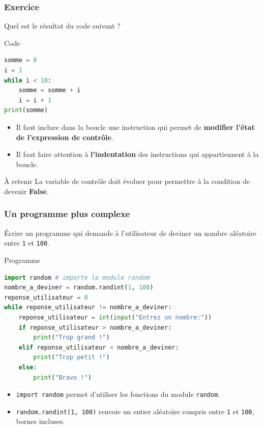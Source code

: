 \documentclass[10pt]{beamer}
\begin{document}
\begin{frame}[containsverbatim]
\frametitle{Exercice}
	
	\begin{alertblock}{}
		Quel est le résultat du code suivant ?
	\end{alertblock}
	
	\vspace{0.15cm}
	
	\begin{exampleblock}{Code}
	\begin{lstlisting}[language=Python]
somme = 0
i = 1
while i < 10:
	somme = somme + i
	i = i + 1
print(somme)
	\end{lstlisting}
	\end{exampleblock}
	\begin{itemize}
		\item Il faut inclure dans la boucle une instruction qui permet
		de \textbf{modifier l'état de l'expression de contrôle}.
		
		\item Il faut faire attention à \textbf{l'indentation} des instructions
		qui appartiennent à la boucle.
	\end{itemize}
	
	\begin{exampleblock}{À retenir}
		\centering
		La variable de contrôle doit évoluer pour permettre
		à la condition de devenir \textbf{False}.
	\end{exampleblock}
\end{frame}

\begin{frame}[containsverbatim]
	\frametitle{Un programme plus complexe}
	

		Écrire un programme qui demande à l'utilisateur de deviner
		un nombre aléatoire entre \texttt{1} et \texttt{100}.
	
	\vspace{0.15cm}
	
	\begin{exampleblock}{Programme}
		\begin{lstlisting}[language=Python]
import random # importe le module random
nombre_a_deviner = random.randint(1, 100)
reponse_utilisateur = 0
while reponse_utilisateur != nombre_a_deviner:
	reponse_utilisateur = int(input("Entrez un nombre:"))
	if reponse_utilisateur > nombre_a_deviner:
		print("Trop grand !")
	elif reponse_utilisateur < nombre_a_deviner:
		print("Trop petit !")
	else:
		print("Bravo !")
		\end{lstlisting}
	\end{exampleblock}

	\begin{itemize}
		\item \texttt{import random} permet d'utiliser les fonctions du module
		\texttt{random}.
		\item \texttt{random.randint(1, 100)} renvoie un entier aléatoire
		compris entre \texttt{1} et \texttt{100}, bornes incluses.
	\end{itemize}
	
\end{frame}
\end{document}

